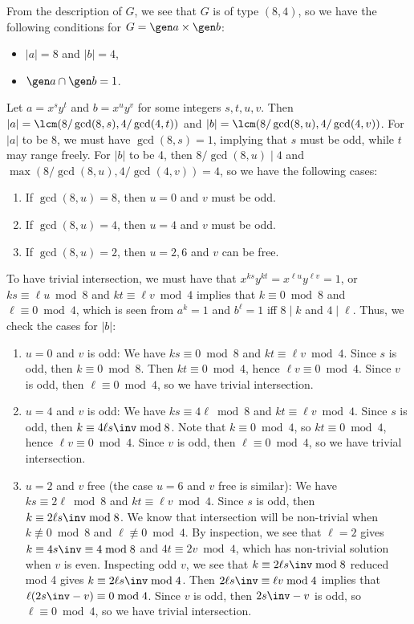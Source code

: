 \begin{solalph}
    \item From the description of $G$, we see that $G$ is of type $(8, 4)$, so we have the following conditions for $G = \gen a \times \gen b$:
    \begin{itemize}
        \item $|a| = 8$ and $|b| = 4$,
        \item $\gen a \cap \gen b = 1$.
    \end{itemize}
    Let $a = x^s y^t$ and $b = x^u y^v$ for some integers $s, t, u, v$. Then $|a| = \lcm(8/\gcd(8, s), 4/\gcd(4, t))$ and $|b| = \lcm(8/\gcd(8, u), 4/\gcd(4, v))$. For $|a|$ to be 8, we must have $\gcd(8, s) = 1$, implying that $s$ must be odd, while $t$ may range freely. For $|b|$ to be 4, then $8/\gcd(8, u) \mid 4$ and $\max(8/\gcd(8, u), 4/\gcd(4, v)) = 4$, so we have the following cases:
    \begin{enumerate}[label=(\arabic*)]
        \item If $\gcd(8, u) = 8$, then $u = 0$ and $v$ must be odd.
        \item If $\gcd(8, u) = 4$, then $u = 4$ and $v$ must be odd.
        \item If $\gcd(8, u) = 2$, then $u = 2, 6$ and $v$ can be free.
    \end{enumerate}
    To have trivial intersection, we must have that $x^{ks} y^{kt} = x^{\ell u} y^{\ell v} = 1$, or $ks \equiv \ell u \bmod 8$ and $kt \equiv \ell v \bmod 4$ implies that $k \equiv 0 \bmod 8$ and $\ell \equiv 0 \bmod 4$, which is seen from $a^k = 1$ and $b^\ell = 1$ iff $8 \mid k$ and $4 \mid \ell$. Thus, we check the cases for $|b|$:
    \begin{enumerate}[label=(\arabic*)]
        \item $u = 0$ and $v$ is odd: We have $ks \equiv 0 \bmod 8$ and $kt \equiv \ell v \bmod 4$. Since $s$ is odd, then $k \equiv 0 \bmod 8$. Then $kt \equiv 0 \bmod 4$, hence $\ell v \equiv 0 \bmod 4$. Since $v$ is odd, then $\ell \equiv 0 \bmod 4$, so we have trivial intersection.
        \item $u = 4$ and $v$ is odd: We have $ks \equiv 4\ell \bmod 8$ and $kt \equiv \ell v \bmod 4$. Since $s$ is odd, then $k \equiv 4\ell s\inv \bmod 8$. Note that $k \equiv 0 \bmod 4$, so $kt \equiv 0 \bmod 4$, hence $\ell v \equiv 0 \bmod 4$. Since $v$ is odd, then $\ell \equiv 0 \bmod 4$, so we have trivial intersection.
        \item $u = 2$ and $v$ free (the case $u = 6$ and $v$ free is similar): We have $ks \equiv 2\ell \bmod 8$ and $kt \equiv \ell v \bmod 4$. Since $s$ is odd, then $k \equiv 2 \ell s\inv \bmod 8$. We know that intersection will be non-trivial when $k \not\equiv 0 \bmod 8$ and $\ell \not\equiv 0 \bmod 4$. By inspection, we see that $\ell = 2$ gives $k \equiv 4s\inv \equiv 4 \bmod 8$ and $4t \equiv 2v \bmod 4$, which has non-trivial solution when $v$ is even. Inspecting odd $v$, we see that $k \equiv 2\ell s\inv \bmod 8$ reduced mod 4 gives $k \equiv 2 \ell s\inv \bmod 4$. Then $2 \ell s\inv \equiv \ell v \bmod 4$ implies that $\ell(2s\inv - v) \equiv 0 \bmod 4$. Since $v$ is odd, then $2s\inv - v$ is odd, so $\ell \equiv 0 \bmod 4$, so we have trivial intersection.

\end{enumerate}
\end{solalph}
